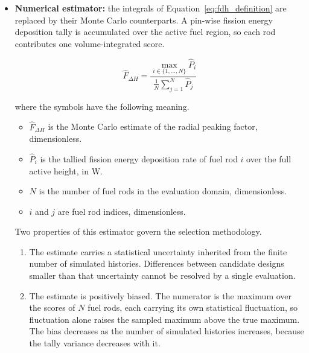 \begin{itemize}
  \item \textbf{Numerical estimator:} the integrals of
        Equation~\eqref{eq:fdh_definition} are replaced by
their Monte Carlo counterparts. A pin-wise fission energy deposition
tally is accumulated over the active fuel region, so each rod
contributes one volume-integrated score.

\begin{equation}
\widehat{F}_{\Delta H}
=
\frac{\displaystyle \max_{i \in \{1,\dots,N\}} \widehat{P}_i}
     {\displaystyle \frac{1}{N} \sum_{j=1}^{N} \widehat{P}_j}
\label{eq:fdh_estimator}
\end{equation}

\noindent where the symbols have the following meaning.

\begin{itemize}
  \item $\widehat{F}_{\Delta H}$ is the Monte Carlo estimate of the
        radial peaking factor, dimensionless.

  \item $\widehat{P}_i$ is the tallied fission energy deposition rate
        of fuel rod $i$ over the full active height, in W.

  \item $N$ is the number of fuel rods in the evaluation domain,
        dimensionless.

  \item $i$ and $j$ are fuel rod indices, dimensionless.
\end{itemize}

Two properties of this estimator govern the selection methodology.

\begin{enumerate}
  \item The estimate carries a statistical uncertainty inherited from
        the finite number of simulated histories. Differences between
        candidate designs smaller than that uncertainty cannot be
        resolved by a single evaluation.

  \item The estimate is positively biased. The numerator is the
        maximum over the scores of $N$ fuel rods, each carrying its own
        statistical fluctuation, so fluctuation alone raises the sampled
        maximum above the true maximum. The bias decreases as the
        number of simulated histories increases, because the tally
        variance decreases with it.
\end{enumerate}


\end{itemize}
